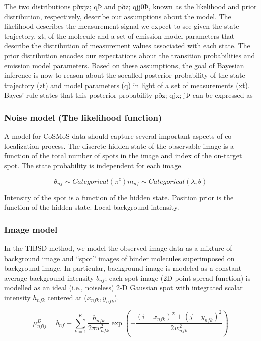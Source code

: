 The two distributions pðxjz; qÞ and pðz; qjj0Þ, known as the likelihood and
prior distribution, respectively, describe our assumptions about the model.
The likelihood describes the measurement signal we expect to see given
the state trajectory, zt, of the molecule and a set of emission model parameters that describe the distribution of measurement values associated
with each state. The prior distribution encodes our expectations about the
transition probabilities and emission model parameters. Based on these assumptions, the goal of Bayesian inference is now to reason about the socalled posterior probability of the state trajectory (zt) and model parameters
(q) in light of a set of measurements (xt). Bayes’ rule states that this posterior probability pðz; qjx; jÞ can be expressed as

\subsubsection{Noise model (The likelihood function)}

A model for CoSMoS data should capture several important aspects of co-localization process. The discrete hidden state of the observable image is a function of the total number of spots in the image and index of the on-target spot. The state probability is independent for each image.

\begin{equation*}
    \theta_{nf} \sim Categorical(\pi^z)
    m_{nf} \sim Categorical(\lambda, \theta)
\end{equation*}

Intensity of the spot is a function of the hidden state. Position prior is the function of the hidden state. Local background intensity.

\subsubsection{Image model}

In the TIBSD method, we model the observed image data as a mixture of background image and “spot” images of binder molecules superimposed on background image. In particular, background image is modeled as a constant average background intensity $b_{nf}$; each spot image (2D point spread function) is modelled as an ideal (i.e., noiseless) 2-D Gaussian spot with integrated scalar intensity $h_{nfk}$ centered at ($x_{nfk}, y_{nfk}$).  

\textbf{\begin{equation*}
    \mu^{D}_{nfij} = b_{nf} + \sum_{k=1}^{K} \dfrac{h_{nfk}}{2 \pi w^2_{nfk}} \exp{\left ( -\dfrac{(i-x_{nfk})^2 + (j-y_{nfk})^2}{2w^2_{nfk}} \right)}
\end{equation*}}


